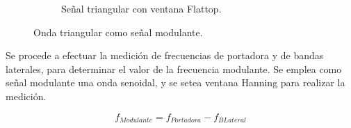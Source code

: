 \begin{figure}[H]
\begin{subfigure}[H]{0.48\textwidth}
          \label{fig:Exp6SeñalFMModulanteTriangularRectangular}
        \end{subfigure}
       \begin{subfigure}[H]{0.3\textwidth}
          \caption{Señal triangular con ventana Flattop.}
          \label{fig:Exp6SeñalFMModulanteTriangularFlattop}
        \end{subfigure}
        \caption{Onda triangular como señal modulante.}
        \label{fig:Exp6SeñalFMModulanteTriangular}
      \end{figure}         

    Se procede a efectuar la medición de frecuencias de portadora y de bandas 
    laterales, para determinar el valor de la frecuencia modulante. Se emplea como 
    señal modulante una onda senoidal, y se setea ventana Hanning para realizar 
    la medición.

      \begin{equation}
        f_{Modulante}=f_{Portadora}-f_{BLateral}
        \label{eqn:Exp6CalculoModulante}
      \end{equation}

